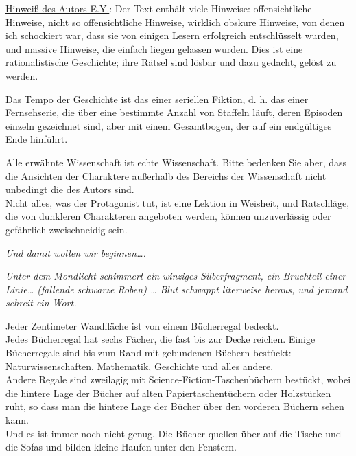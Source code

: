 

\hypertarget{ein-uxe4uuxdferst-unwahrscheinlicher-tag}{%

\uline{Hinweiß des Autors E.Y.}: Der Text enthält viele Hinweise: offensichtliche Hinweise, nicht so offensichtliche Hinweise, wirklich obskure Hinweise, von denen ich schockiert war, dass sie von einigen Lesern erfolgreich entschlüsselt wurden, und massive Hinweise, die einfach liegen gelassen wurden. Dies ist eine rationalistische Geschichte; ihre Rätsel sind lösbar und dazu gedacht, gelöst zu werden.

Das Tempo der Geschichte ist das einer seriellen Fiktion, d. h. das einer Fernsehserie, die über eine bestimmte Anzahl von Staffeln läuft, deren Episoden einzeln gezeichnet sind, aber mit einem Gesamtbogen, der auf ein endgültiges Ende hinführt.

Alle erwähnte Wissenschaft ist echte Wissenschaft. Bitte bedenken Sie aber, dass die Ansichten der Charaktere außerhalb des Bereichs der Wissenschaft nicht unbedingt die des Autors sind.\\ Nicht alles, was der Protagonist tut, ist eine Lektion in Weisheit, und Ratschläge, die von dunkleren Charakteren angeboten werden, können unzuverlässig oder gefährlich zweischneidig sein.

\emph{Und damit wollen wir beginnen….}

\emph{Unter dem Mondlicht schimmert ein winziges Silberfragment, ein Bruchteil einer Linie… (fallende schwarze Roben) … Blut schwappt literweise heraus, und jemand schreit ein Wort.}

Jeder Zentimeter Wandfläche ist von einem Bücherregal bedeckt.\\ Jedes Bücherregal hat sechs Fächer, die fast bis zur Decke reichen. Einige Bücherregale sind bis zum Rand mit gebundenen Büchern bestückt: Naturwissenschaften, Mathematik, Geschichte und alles andere.\\ Andere Regale sind zweilagig mit Science-Fiction-Taschenbüchern bestückt, wobei die hintere Lage der Bücher auf alten Papiertaschentüchern oder Holzstücken ruht, so dass man die hintere Lage der Bücher über den vorderen Büchern sehen kann.\\ Und es ist immer noch nicht genug. Die Bücher quellen über auf die Tische und die Sofas und bilden kleine Haufen unter den Fenstern.

}
